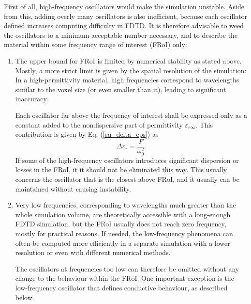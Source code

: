 First of all, high-frequency oscillators would make the simulation unstable.
Aside from this, adding overly many oscillators is also inefficient, because each oscillator defined increases computing difficulty in FDTD. 
It is therefore advisable to weed the oscillators to a minimum acceptable number necessary, and to describe the material within some frequency range of interest (FRoI) %
only:
\begin{enumerate}
 \item{
The upper bound for FRoI is limited by numerical stability as stated above. Mostly, a more strict limit is given by the spatial resolution of the simulation: In a high-permittivity material, high frequencies correspond to wavelengths similar to the voxel size (or even smaller than it), leading to significant inaccuracy. 

Each oscillator far above the frequency of interest shall be expressed only as a constant added to the nondispersive part of permittivity $\varepsilon_{r\infty}$. This contribution is given by Eq. (\ref{eq_delta_eps}) as 
$$\Delta \varepsilon_r = \frac{F}{\omega_0^2}.$$ 
If some of the high-frequency oscillators introduces significant dispersion or losses in the FRoI, it it should not be eliminated this way. This usually concerns the oscillator that is the closest above FRoI, and it usually can be maintained without causing instability.
} 
 \item{
Very low frequencies, corresponding to wavelengths much greater than the whole simulation volume, are theoretically accessible with a long-enough FDTD simulation, but the FRoI usually does not reach zero frequency, mostly for practical reasons. If needed, the low-frequency phenomena can often be computed more efficiently in a separate simulation with a lower resolution or even with different numerical methods.

The oscillators at frequencies too low can therefore be omitted without any change to the behaviour within the FRoI. One important exception is the low-frequency oscillator that defines conductive behaviour, as described below.
} 
 \end{enumerate}

